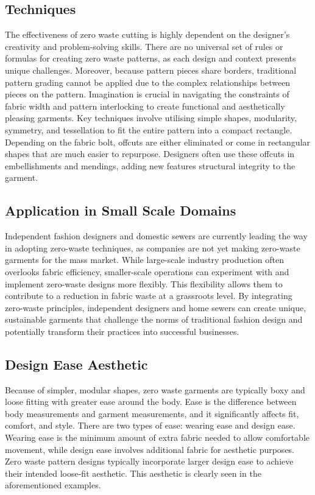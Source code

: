 \subsection{Techniques}
The effectiveness of zero waste cutting is highly dependent on the designer's creativity and problem-solving skills. There are no universal set of rules or formulas for creating zero waste patterns, as each design and context presents unique challenges. Moreover, because pattern pieces share borders, traditional pattern grading cannot be applied due to the complex relationships between pieces on the pattern. Imagination is crucial in navigating the constraints of fabric width and pattern interlocking to create functional and aesthetically pleasing garments. Key techniques involve utilising simple shapes, modularity, symmetry, and tessellation to fit the entire pattern into a compact rectangle. Depending on the fabric bolt, offcuts are either eliminated or come in rectangular shapes that are much easier to repurpose. Designers often use these offcuts in embellishments and mendings, adding new features structural integrity to the garment.

\subsection{Application in Small Scale Domains}
Independent fashion designers and domestic sewers are currently leading the way in adopting zero-waste techniques, as companies are not yet making zero-waste garments for the mass market. While large-scale industry production often overlooks fabric efficiency, smaller-scale operations can experiment with and implement zero-waste designs more flexibly. This flexibility allows them to contribute to a reduction in fabric waste at a grassroots level. By integrating zero-waste principles, independent designers and home sewers can create unique, sustainable garments that challenge the norms of traditional fashion design and potentially transform their practices into successful businesses.

\subsection{Design Ease Aesthetic}
Because of simpler, modular shapes, zero waste garments are typically boxy and loose fitting with greater ease around the body. Ease is the difference between body measurements and garment measurements, and it significantly affects fit, comfort, and style. There are two types of ease: wearing ease and design ease. Wearing ease is the minimum amount of extra fabric needed to allow comfortable movement, while design ease involves additional fabric for aesthetic purposes. Zero waste pattern designs typically incorporate larger design ease to achieve their intended loose-fit aesthetic. This aesthetic is clearly seen in the aforementioned examples.

